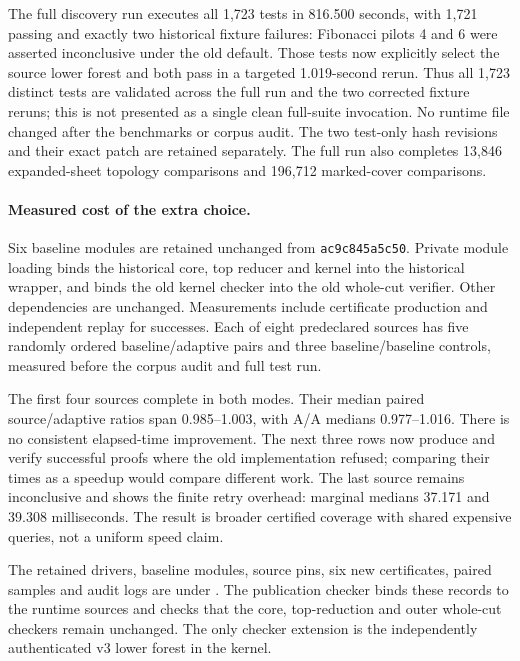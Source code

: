 The full discovery run executes all 1,723 tests in 816.500 seconds, with
1,721 passing and exactly two historical fixture failures: Fibonacci pilots
4 and 6 were asserted inconclusive under the old default. Those tests now
explicitly select the source lower forest and both pass in a targeted
1.019-second rerun. Thus all 1,723 distinct tests are validated across the
full run and the two corrected fixture reruns; this is not presented as a
single clean full-suite invocation. No runtime file changed after the
benchmarks or corpus audit. The two test-only hash revisions and their
exact patch are retained separately. The full run also completes 13,846
expanded-sheet topology comparisons and 196,712 marked-cover comparisons.

\paragraph{Measured cost of the extra choice.}
Six baseline modules are retained unchanged from
\texttt{ac9c845a5c50}. Private module loading binds the historical core,
top reducer and kernel into the historical wrapper, and binds the old
kernel checker into the old whole-cut verifier. Other dependencies are
unchanged. Measurements include certificate production and independent
replay for successes. Each of eight predeclared sources has five randomly
ordered baseline/adaptive pairs and three baseline/baseline controls,
measured before the corpus audit and full test run.



The first four sources complete in both modes. Their median paired
source/adaptive ratios span 0.985--1.003, with A/A medians 0.977--1.016.
There is no consistent elapsed-time improvement. The next three rows now
produce and verify successful proofs where the old implementation refused;
comparing their times as a speedup would compare different work. The last
source remains inconclusive and shows the finite retry overhead: marginal
medians 37.171 and 39.308 milliseconds. The result is broader certified
coverage with shared expensive queries, not a uniform speed claim.

The retained drivers, baseline modules, source pins, six new certificates,
paired samples and audit logs are under .
The publication checker binds these records to the runtime sources and
checks that the core, top-reduction and outer whole-cut checkers remain
unchanged. The only checker extension is the independently authenticated
v3 lower forest in the kernel.
